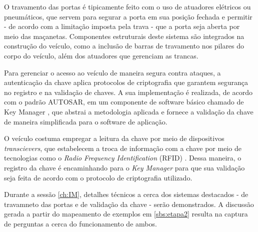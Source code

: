 O travamento das portas é tipicamente feito com o uso de atuadores elétricos ou pneumáticos, que servem para segurar a porta em sua posição fechada e permitir - de 
acordo com a limitação imposta pela trava - que a porta seja aberta por meio das maçanetas. Componentes estruturais deste sistema são integrados na construção do 
veículo, como a inclusão de barras de travamento nos pilares do corpo do veículo, além dos atuadores que gerenciam as trancas.

Para gerenciar o acesso ao veículo de maneira segura contra ataques, a autenticação da chave aplica protocolos de criptografia \cite{glocker2016protocol} que garantem
segurança no registro e na validação de chaves. A sua implementação é realizada, de acordo com o padrão AUTOSAR, em um componente de software básico chamado de Key 
Manager \cite{autosarKeyManager}, que abstrai a metodologia aplicada e fornece a validação da chave de maneira simplificada para o software de aplicação. 

O veículo costuma empregar a leitura da chave por meio de dispositivos \textit{transcievers}, que estabelecem a troca de informação com a chave por meio de tecnologias 
como o \textit{Radio Frequency Identification} (RFID) \cite{arduinoRFID}. Dessa maneira, o registro da chave é encaminhando para o \textit{Key Manager} para que sua 
validação seja feita de acordo com o protocolo de criptografia utilizado.

Durante a sessão \ref{ch:IM}, detalhes técnicos a cerca dos sistemas destacados - de travamneto das portas e de validação da chave - serão demonstrados. A discussão 
gerada a partir do mapeamento de exemplos em \ref{sbs:etapa2} resulta na captura de perguntas a cerca do funcionamento de ambos.

